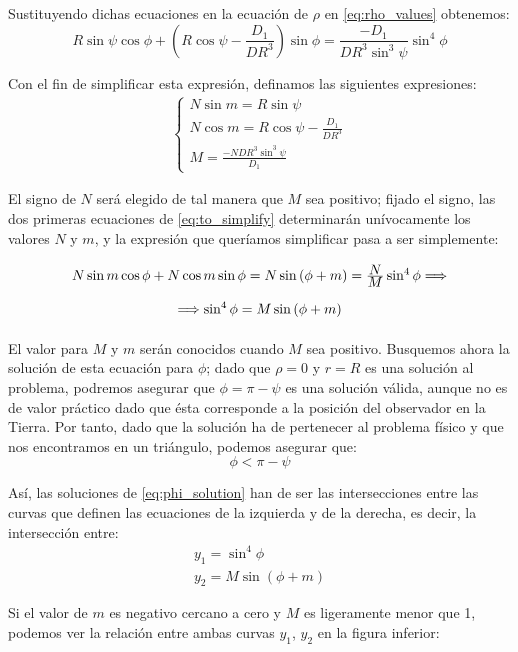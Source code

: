 \documentclass[11pt]{article}
\newcommand\ddfrac[2]{\frac{\displaystyle #1}{\displaystyle #2}}
\begin{document}
Sustituyendo dichas ecuaciones en la ecuación de $\rho$ en \eqref{eq:rho_values} obtenemos:
\[
R\sin{\psi}\cos{\phi}+\left(R\cos{\psi}-\ddfrac{D_1}{DR^3}\right)\sin{\phi}=\ddfrac{-D_1}{DR^3\sin^3{\psi}}\sin^4{\phi}
\]

Con el fin de simplificar esta expresión, definamos las siguientes expresiones:
\begin{align}
\left\{
\begin{array}{l}
	N\sin{m}=R\sin{\psi}\\
	N\cos{m}=R\cos{\psi}-\ddfrac{D_1}{DR^3}\\
	M=\ddfrac{-NDR^3\sin^3{\psi}}{D_1}
\end{array}
\right.
\label{eq:to_simplify}
\end{align}

El signo de $N$ será elegido de tal manera que $M$ sea positivo; fijado el signo, las dos primeras ecuaciones de \eqref{eq:to_simplify} determinarán unívocamente los valores $N$ y $m$, y la expresión que queríamos simplificar pasa a ser simplemente:
\begin{align}
\def\arraystretch{2}
\begin{array}{c}
	N\sin{m}\cos{\phi}+N\cos{m}\sin{\phi}=N\sin{(\phi+m)}=\ddfrac{N}{M}\sin^4{\phi} \Longrightarrow\\
	\Longrightarrow\sin^4{\phi}=M\sin{(\phi+m)}
\end{array}
\label{eq:phi_solution}
\end{align}

El valor para $M$ y $m$ serán conocidos cuando $M$ sea positivo. Busquemos ahora la solución de esta ecuación para $\phi$; dado que $\rho=0$ y $r=R$ es una solución al problema, podremos asegurar que $\phi=\pi-\psi$ es una solución válida, aunque no es de valor práctico dado que ésta corresponde a la posición del observador en la Tierra. Por tanto, dado que la solución ha de pertenecer al problema físico y que nos encontramos en un triángulo, podemos asegurar que:
\[
\phi<\pi-\psi
\]

Así, las soluciones de \eqref{eq:phi_solution} han de ser las intersecciones entre las curvas que definen las ecuaciones de la izquierda y de la derecha, es decir, la intersección entre:
\[
\begin{array}{l}
y_1=\sin^4{\phi}\\
y_2=M\sin{(\phi+m)}
\end{array}
\]

Si el valor de $m$ es negativo cercano a cero y $M$ es ligeramente menor que 1, podemos ver la relación entre ambas curvas $y_1$, $y_2$ en la figura inferior:
\end{document}
